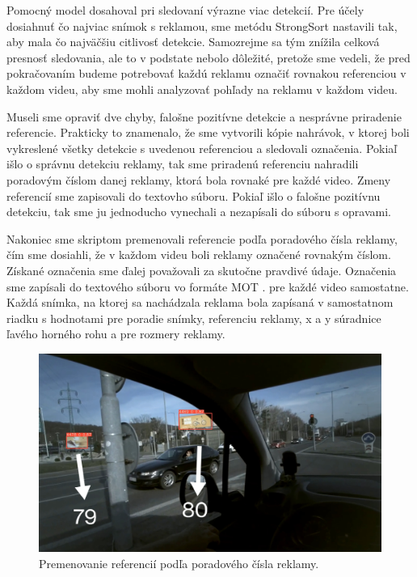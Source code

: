 Pomocný model dosahoval pri sledovaní výrazne viac detekcií. Pre účely dosiahnuť čo najviac snímok s reklamou, sme metódu StrongSort nastavili tak, aby mala čo najväčšiu citlivosť detekcie. Samozrejme sa tým znížila celková presnosť sledovania, ale to v podstate nebolo dôležité, pretože sme vedeli, že pred pokračovaním budeme potrebovať každú reklamu označiť rovnakou referenciou v každom videu, aby sme mohli analyzovať pohľady na reklamu v každom videu.

Museli sme opraviť dve chyby, falošne pozitívne detekcie a nesprávne priradenie referencie. Prakticky to znamenalo, že sme vytvorili kópie nahrávok, v ktorej boli vykreslené všetky detekcie s uvedenou referenciou a sledovali označenia. Pokiaľ išlo o správnu detekciu reklamy, tak sme priradenú referenciu nahradili poradovým číslom danej reklamy, ktorá bola rovnaké pre každé video. Zmeny referencií sme zapisovali do textovho súboru. Pokiaľ išlo o falošne pozitívnu detekciu, tak sme ju jednoducho vynechali a nezapísali do súboru s opravami.

Nakoniec sme skriptom premenovali referencie podľa poradového čísla reklamy, čím sme dosiahli, že v každom videu boli reklamy označené rovnakým číslom. Získané označenia sme ďalej považovali za skutočne pravdivé údaje. Označenia sme zapísali do textového súboru vo formáte MOT \cite{mot}. pre každé video samostatne. Každá snímka, na ktorej sa nachádzala reklama bola zapísaná v samostatnom riadku s hodnotami pre poradie snímky, referenciu reklamy, x a y súradnice ľavého horného rohu a pre rozmery reklamy.

\begin{figure}[ht]
     \centering
     \includegraphics[width=1\textwidth]{images/04/mapping.jpg}
     \caption{Premenovanie referencií podľa poradového čísla reklamy.}
     \label{img:mapping}
 \end{figure}

